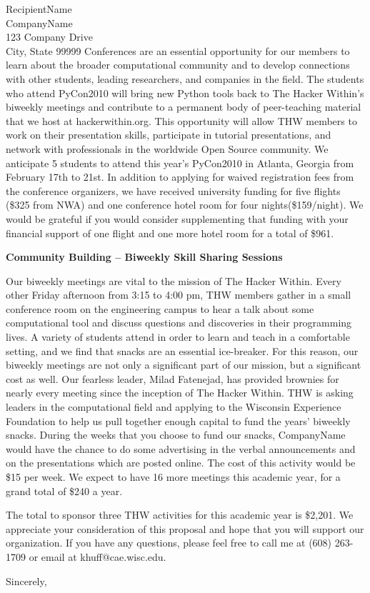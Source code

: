 \documentclass{letter}
\begin{document}
\begin{letter}{RecipientName\\
CompanyName\\
123 Company Drive\\
City, State 99999
}
Conferences are an essential opportunity for our members to learn about the broader computational community and to develop connections with other students, leading researchers, and companies in the field. The students who attend PyCon2010 will bring new Python tools back to The Hacker Within's biweekly meetings and contribute to a permanent body of peer-teaching material that we host at hackerwithin.org. This opportunity will allow THW members to work on their presentation skills, participate in tutorial presentations, and network with professionals in the worldwide Open Source community. We anticipate 5 students to attend this year’s PyCon2010 in Atlanta, Georgia from February 17th to 21st.  In addition to applying for waived registration fees from the conference organizers, we have received university funding for five flights (\$325 from NWA) and one conference hotel room for four nights(\$159/night). We would be grateful if you would consider supplementing that funding with your financial support of one flight and one more hotel room for a total of \$961.




\textbf{Community Building –  Biweekly Skill Sharing Sessions}

Our biweekly meetings are vital to the mission of The Hacker Within. Every other Friday afternoon from 3:15 to 4:00 pm, THW members gather in a small conference room on the engineering campus to hear a talk about some computational tool and discuss questions and discoveries in their programming lives. A variety of students attend in order to learn and teach in a comfortable setting, and we find that snacks are an essential ice-breaker. For this reason, our biweekly meetings are not only a significant part of our mission, but a significant cost as well. Our fearless leader, Milad Fatenejad, has provided brownies for nearly every meeting since the inception of The Hacker Within. THW is asking leaders in the computational field and applying to the Wisconsin Experience Foundation to help us pull together enough capital to fund the years' biweekly snacks. During the weeks that you choose to fund our snacks, CompanyName would have the chance to do some advertising in the verbal announcements and on the presentations which are posted online. The cost of this activity would be \$15 per week. We expect to have 16 more meetings this academic year, for a grand total of \$240 a year.

The total to sponsor three THW activities for this academic year is \$2,201. We appreciate your consideration of this proposal and hope that you will support our organization.
If you have any questions, please feel free to call me at (608) 263-1709 or email at khuff@cae.wisc.edu.

	\closing{Sincerely,}

 \end{letter}
\end{document}
